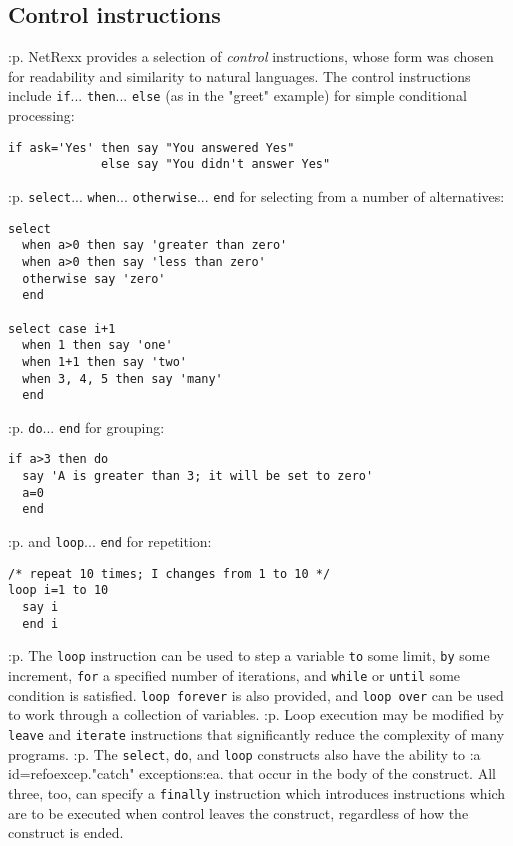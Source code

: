 \subsection{Control instructions}\label{refocontr}
:p.
NetRexx provides a selection of \emph{control} instructions, whose form was
chosen for readability and similarity to natural languages.  The control
instructions include \texttt{if}... \texttt{then}... \texttt{else} (as
in the "greet" example) for simple conditional processing:
\begin{verbatim}
if ask='Yes' then say "You answered Yes"
             else say "You didn't answer Yes"
\end{verbatim}
:p.
\texttt{select}... \texttt{when}... \texttt{otherwise}... \texttt{end}
for selecting from a number of alternatives:
\begin{verbatim}
select
  when a>0 then say 'greater than zero'
  when a>0 then say 'less than zero'
  otherwise say 'zero'
  end

select case i+1
  when 1 then say 'one'
  when 1+1 then say 'two'
  when 3, 4, 5 then say 'many'
  end
\end{verbatim}
:p.
\texttt{do}... \texttt{end} for grouping:
\begin{verbatim}
if a>3 then do
  say 'A is greater than 3; it will be set to zero'
  a=0
  end
\end{verbatim}
:p.
and \texttt{loop}... \texttt{end} for repetition:
\begin{verbatim}
/* repeat 10 times; I changes from 1 to 10 */
loop i=1 to 10
  say i
  end i
\end{verbatim}
:p.
The \texttt{loop} instruction can be used to step a variable \texttt{to}
some limit, \texttt{by} some increment, \texttt{for} a specified number of
iterations, and \texttt{while} or \texttt{until} some condition is
satisfied.  \texttt{loop forever} is also provided, and
\texttt{loop over} can be used to work through a collection of
variables.
:p.
Loop execution may be modified by \texttt{leave} and \texttt{iterate}
instructions that significantly reduce the complexity of many programs.
:p.
The \texttt{select}, \texttt{do}, and \texttt{loop} constructs also have
the ability to :a id=refoexcep."catch" exceptions:ea. that occur in
the body of the construct.  All three, too, can specify a
\texttt{finally} instruction which introduces instructions which are to
be executed when control leaves the construct, regardless of how the
construct is ended.
